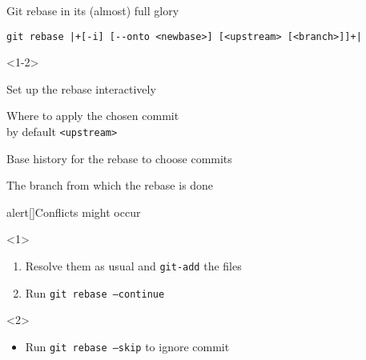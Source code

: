 \documentclass[usenames,svgnames,14pt]{beamer}
\newcommand{\then}{\raisebox{2pt}{$\;\drsh\;$}}
\begin{document}
\begin{frame}[fragile]{Git rebase in its (almost) full glory}
    \begin{lstlisting}[style=MyBash, xleftmargin=5mm, xrightmargin=5mm, aboveskip=-6mm]
        git rebase |+[-i] [--onto <newbase>] [<upstream> [<branch>]]+|
    \end{lstlisting}
    \begin{overlayarea}{\textwidth}{0.5\textheight}
        \begin{onlyenv}<1-2>
            \vspace{2mm}
            \begin{description}
                \item[-i] Set up the rebase interactively
                \item[<newbase>] Where to apply the chosen commit\\ \then by default \texttt{<upstream>}
                \item[<upstream>] Base history for the rebase to choose commits
                \item[<branch>] The branch from which the rebase is done
            \end{description}
            \begin{varblock*}{alert}[\textwidth]{Conflicts might occur}
                \begin{overlayarea}{\textwidth}{0.12\textheight}
                    \vspace{-4.5mm}
                    \begin{onlyenv}<1>
                        \begin{enumerate}
                            \item Resolve them as usual and \;\texttt{git-add}\; the files
                            \item Run \;\texttt{git rebase --continue}
                        \end{enumerate}
                    \end{onlyenv}
                    \begin{onlyenv}<2>
                        \vspace{-3pt}
                        \begin{itemize}
                            \item Run \;\texttt{git rebase --skip}\; to ignore commit

\end{itemize}
\end{onlyenv}
\end{overlayarea}
\end{varblock*}
\end{onlyenv}
\end{overlayarea}
\end{frame}
\end{document}
